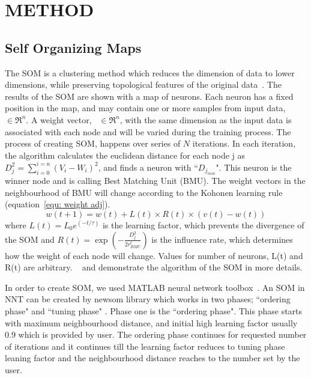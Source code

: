 
\section{METHOD}
\label{sec: method}
 \subsection{Self Organizing Maps}
 \label{sec: som}
 The SOM is a clustering method which reduces the dimension of data to lower dimensions, while preserving topological features of the original data~\citep{Kohonen98}. 
 The results of the SOM are shown with a map of neurons.
 Each neuron has a fixed position in the map, and may contain one or more samples from input data,  $\in \Re^n$.
 A weight vector,~ $\in \Re^n$, with the same dimension as the input data is associated with each node and will be varied during the training process.
 The process of creating SOM, happens over series of $N$ iterations.
 In each iteration, the algorithm calculates the euclidean distance for each node j as  $D_j^2= \sum_{i=0}^{i=n} (V_i - W_i)^2$, and finds a neuron with ``$D_{j_{min}}$". 
 This neuron is the winner node and is calling Best Matching Unit (BMU). 
 The weight vectors in the neighbourhood of BMU will change according to the Kohonen learning rule (equation~\ref{equ: weight adj}). 
  \begin{equation}
            \label{equ: weight adj}
            w(t+1)=w(t)+L(t) \times R(t) \times(v(t)-w(t))
 \end{equation}
where $L(t) = L_0 e^{(-t/\tau)}$ is the learning factor, which prevents the divergence of the SOM and $R(t)=\exp(-\frac{D_j^2}{2r^t_{BMU}})$ is the influence rate, which determines how the weight of each node will change.
Values for number of neurons, L(t) and R(t) are arbitrary. 
~\cite{Geach12} and \cite{Rahmani16b} demonstrate the algorithm of the SOM in more details.


     In order to create SOM, we used {\sc MATLAB} neural network toolbox~\citep[NNT,][]{matlabtolbox}.
     An SOM in {\sc NNT} can be created by {\sc newsom} library which works in two phases; ``ordering phase" and ``tuning phase" . 
     Phase one is the ``ordering phase". 
     This phase starts with maximum neighbourhood distance, and initial high learning factor usually 0.9 which is provided by user. 
     The ordering phase continues for requested number of iterations and it continues till the learning factor reduces to tuning phase leaning factor and the neighbourhood distance reaches to the number set by the user.
     
